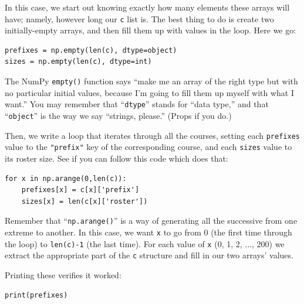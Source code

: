 In this case, we start out knowing exactly how many elements these arrays will
have; namely, however long our \texttt{c} list is. The best thing to do is
create two initially-empty arrays, and then fill them up with values in the
loop. Here we go:

\begin{Verbatim}[fontsize=\small,samepage=true,frame=single,framesep=3mm]
prefixes = np.empty(len(c), dtype=object)
sizes = np.empty(len(c), dtype=int)
\end{Verbatim}

\label{objectDtype}

The NumPy \texttt{empty()} function says ``make me an array of the right type
but with no particular initial values, because I'm going to fill them up myself
with what I want.'' You may remember that ``\texttt{dtype}'' stands for ``data
type,'' and that ``\texttt{object}'' is the way we say ``strings, please.''
(Props if you do.)

Then, we write a loop that iterates through all the courses, setting each
\texttt{prefixes} value to the \texttt{"prefix"} key of the corresponding
course, and each \texttt{sizes} value to its roster size. See if you can follow
this code which does that:

\begin{Verbatim}[fontsize=\small,samepage=true,frame=single,framesep=3mm]
for x in np.arange(0,len(c)):
    prefixes[x] = c[x]['prefix']
    sizes[x] = len(c[x]['roster'])
\end{Verbatim}

Remember that ``\texttt{np.arange()}'' is a way of generating all the
successive from one extreme to another. In this case, we want \texttt{x} to go
from 0 (the first time through the loop) to \texttt{len(c)-1} (the last time). 
For each value of \texttt{x} (0, 1, 2, ..., 200) we extract the appropriate
part of the \texttt{c} structure and fill in our two arrays' values.

\smallskip
Printing these verifies it worked:

\begin{Verbatim}[fontsize=\small,samepage=true,frame=single,framesep=3mm]
print(prefixes)
\end{Verbatim}

\vspace{-.2in}

